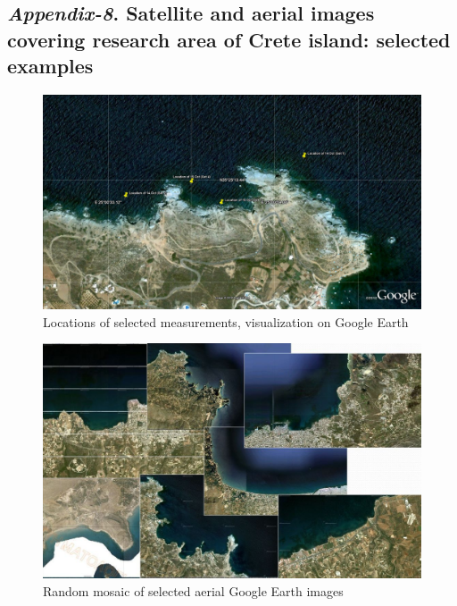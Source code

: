 \documentclass[10pt, a4paper]{article}
\begin{document}
\begin{appendices}
\subsection{\textit{Appendix-8}. Satellite and aerial images covering research area of Crete island: selected examples}

\begin{figure}[H]
	\begin{center}
		\includegraphics[scale=0.20]{Locations_Meas.jpg}
		\caption{Locations of selected measurements, visualization on Google Earth­}\label{fig:A.36}
	\end{center}	
\end{figure}

\begin{figure}[H]
	\begin{center}
		\includegraphics[scale=0.25]{App-8.jpg}
		\caption{Random mosaic of selected aerial Google Earth images}\label{fig:A.37}	
	\end{center}	
\end{figure}
\pagebreak


\end{appendices}
\end{document}
